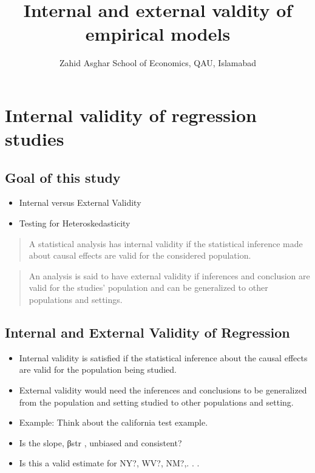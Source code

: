 \documentclass[
  letterpaper,
  DIV=11,
  numbers=noendperiod]{scrartcl}
\title{Internal and external valdity of empirical models}
\author{Zahid Asghar School of Economics, QAU, Islamabad}
\date{}
\providecommand{\tightlist}{%
  \setlength{\itemsep}{0pt}\setlength{\parskip}{0pt}}\usepackage{longtable,booktabs,array}
\begin{document}
\maketitle
\ifdefined\Shaded\renewenvironment{Shaded}{\begin{tcolorbox}[interior hidden, frame hidden, sharp corners, breakable, enhanced, boxrule=0pt, borderline west={3pt}{0pt}{shadecolor}]}{\end{tcolorbox}}\fi

\hypertarget{internal-validity-of-regression-studies}{%
\section{Internal validity of regression
studies}\label{internal-validity-of-regression-studies}}

\hypertarget{goal-of-this-study}{%
\subsection{Goal of this study}\label{goal-of-this-study}}

\begin{itemize}
\tightlist
\item
  Internal versus External Validity
\item
  Testing for Heteroskedasticity
\end{itemize}

\begin{quote}
A statistical analysis has internal validity if the statistical
inference made about causal effects are valid for the considered
population.
\end{quote}

\begin{quote}
An analysis is said to have external validity if inferences and
conclusion are valid for the studies' population and can be generalized
to other populations and settings.
\end{quote}

\hypertarget{internal-and-external-validity-of-regression}{%
\subsection{Internal and External Validity of
Regression}\label{internal-and-external-validity-of-regression}}

\begin{itemize}
\tightlist
\item
  Internal validity is satisfied if the statistical inference about the
  causal effects are valid for the population being studied.
\item
  External validity would need the inferences and conclusions to be
  generalized from the population and setting studied to other
  populations and setting.
\item
  Example: Think about the california test example.
\item
  Is the slope, βstr , unbiased and consistent?
\item
  Is this a valid estimate for NY?, WV?, NM?,. . .
\end{itemize}
\end{document}
